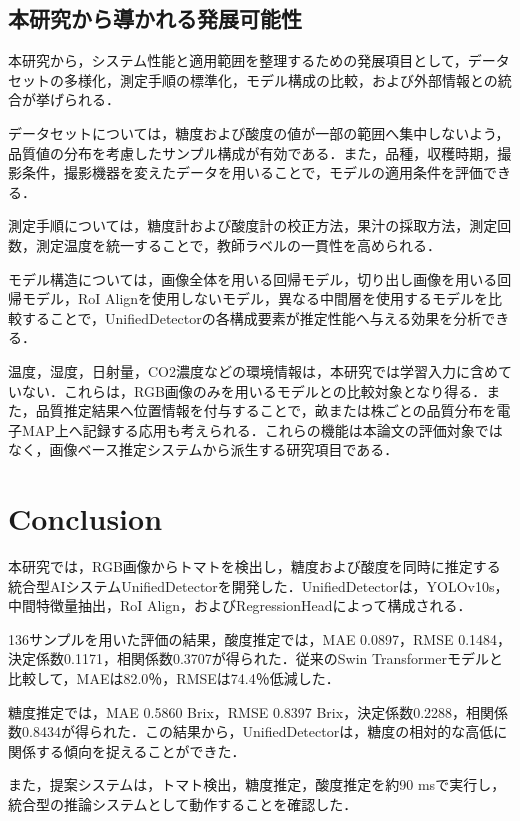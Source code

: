 \documentclass[authorproof,JRM,paper]{fujipressarticle}
\begin{document}
\subsection{本研究から導かれる発展可能性}

本研究から，システム性能と適用範囲を整理するための発展項目として，データセットの多様化，測定手順の標準化，モデル構成の比較，および外部情報との統合が挙げられる．

データセットについては，糖度および酸度の値が一部の範囲へ集中しないよう，品質値の分布を考慮したサンプル構成が有効である．また，品種，収穫時期，撮影条件，撮影機器を変えたデータを用いることで，モデルの適用条件を評価できる．

測定手順については，糖度計および酸度計の校正方法，果汁の採取方法，測定回数，測定温度を統一することで，教師ラベルの一貫性を高められる．

モデル構造については，画像全体を用いる回帰モデル，切り出し画像を用いる回帰モデル，RoI Alignを使用しないモデル，異なる中間層を使用するモデルを比較することで，UnifiedDetectorの各構成要素が推定性能へ与える効果を分析できる．

温度，湿度，日射量，CO2濃度などの環境情報は，本研究では学習入力に含めていない．これらは，RGB画像のみを用いるモデルとの比較対象となり得る．また，品質推定結果へ位置情報を付与することで，畝または株ごとの品質分布を電子MAP上へ記録する応用も考えられる．これらの機能は本論文の評価対象ではなく，画像ベース推定システムから派生する研究項目である．

\section{Conclusion}

本研究では，RGB画像からトマトを検出し，糖度および酸度を同時に推定する統合型AIシステムUnifiedDetectorを開発した．UnifiedDetectorは，YOLOv10s，中間特徴量抽出，RoI Align，およびRegressionHeadによって構成される．

136サンプルを用いた評価の結果，酸度推定では，MAE 0.0897，RMSE 0.1484，決定係数0.1171，相関係数0.3707が得られた．従来のSwin Transformerモデルと比較して，MAEは82.0％，RMSEは74.4％低減した．

糖度推定では，MAE 0.5860 Brix，RMSE 0.8397 Brix，決定係数0.2288，相関係数0.8434が得られた．この結果から，UnifiedDetectorは，糖度の相対的な高低に関係する傾向を捉えることができた．

また，提案システムは，トマト検出，糖度推定，酸度推定を約90 msで実行し，統合型の推論システムとして動作することを確認した．
\end{document}
